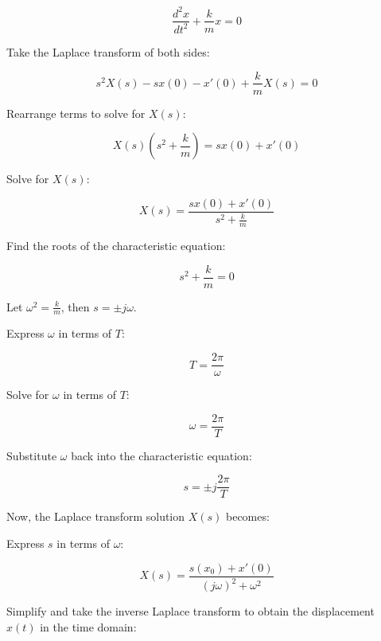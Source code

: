 \documentclass[journal,12pt,twocolumn]{IEEEtran}
\theoremstyle{remark}
\begin{document}
\begin{equation}
\frac{d^2x}{dt^2} + \frac{k}{m}x = 0
\end{equation}

Take the Laplace transform of both sides:

\begin{equation}
s^2X(s) - sx(0) - x'(0) + \frac{k}{m}X(s) = 0
\end{equation}

Rearrange terms to solve for \(X(s)\):

\begin{equation}
X(s)(s^2 + \frac{k}{m}) = sx(0) + x'(0)
\end{equation}

Solve for \(X(s)\):

\begin{equation}
X(s) = \frac{sx(0) + x'(0)}{s^2 + \frac{k}{m}}
\end{equation}

Find the roots of the characteristic equation:

\begin{equation}
s^2 + \frac{k}{m} = 0
\end{equation}

Let \(\omega^2 = \frac{k}{m}\), then \(s = \pm j\omega\).

Express \(\omega\) in terms of \(T\):

\begin{equation}
T = \frac{2\pi}{\omega}
\end{equation}

Solve for \(\omega\) in terms of \(T\):

\begin{equation}
\omega = \frac{2\pi}{T}
\end{equation}

Substitute \(\omega\) back into the characteristic equation:

\begin{equation}
s = \pm j\frac{2\pi}{T}
\end{equation}

Now, the Laplace transform solution \(X(s)\) becomes:

Express \(s\) in terms of \(\omega\):

\begin{equation}
X(s) = \frac{s(x_0) + x'(0)}{(j\omega)^2 + \omega^2}
\end{equation}

Simplify and take the inverse Laplace transform to obtain the displacement \(x(t)\) in the time domain:
\end{document}
